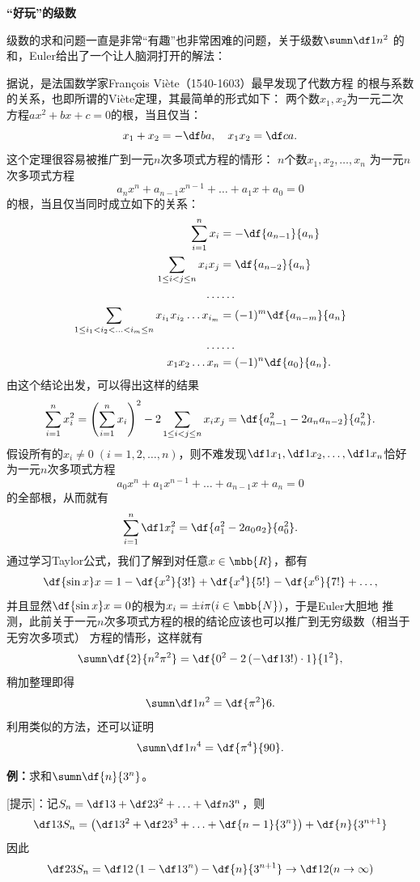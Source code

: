 \begin{shaded}
	{\bf “好玩”的级数}
	
	级数的求和问题一直是非常“有趣”也非常困难的问题，关于级数$\sumn\df1{n^2}$
	的和，Euler给出了一个让人脑洞打开的解法：
	
	据说，是法国数学家François Viète（1540-1603）最早发现了代数方程
	的根与系数的关系，也即所谓的{\kaishu Viète定理}，其最简单的形式如下：
	两个数$x_1,x_2$为一元二次方程$ax^2+bx+c=0$的根，当且仅当：
	$$x_1+x_2=-\df ba,\quad x_1x_2=\df ca.$$
	这个定理很容易被推广到一元$n$次多项式方程的情形：	$n$个数$x_1,x_2,\ldots,x_n$
	为一元$n$次多项式方程
	$$a_nx^n+a_{n-1}x^{n-1}+\ldots+a_1x+a_0=0$$
	的根，当且仅当同时成立如下的关系：
	\begin{align*}
		\sum\limits_{i=1}^nx_i&=-\df{a_{n-1}}{a_n}\\
		\sum\limits_{1\leq i<j\leq n}x_ix_j&=\df{a_{n-2}}{a_n}\\
		\ldots&\ldots\\
		\sum\limits_{1\leq i_1<i_2<\ldots<i_m\leq n}
		x_{i_1}x_{i_2}\ldots x_{i_m}&=(-1)^m\df{a_{n-m}}{a_n}\\
		\ldots&\ldots\\
		x_1x_2\ldots x_n&=(-1)^n\df{a_0}{a_n}.
	\end{align*}
	由这个结论出发，可以得出这样的结果
	$$\sum\limits_{i=1}^nx_i^2=\left(\sum\limits_{i=1}^nx_i\right)^2
	-2\sum\limits_{1\leq i<j\leq n}x_ix_j=\df{a_{n-1}^2-2a_na_{n-2}}{a_n^2}.$$
	假设所有的$x_i\ne0\;(i=1,2,\ldots,n)$，则不难发现$\df1{x_1},\df1{x_2},\ldots,
	\df1{x_n}$恰好为一元$n$次多项式方程
	$$a_0x^n+a_1x^{n-1}+\ldots+a_{n-1}x+a_n=0$$
	的全部根，从而就有
	$$\sum\limits_{i=1}^n\df1{x_i^2}=\df{a_1^2-2a_0a_2}{a_0^2}.$$
	通过学习Taylor公式，我们了解到对任意$x\in\mbb{R}$，都有
	$$\df{\sin x}x=1-\df{x^2}{3!}+\df{x^4}{5!}-\df{x^6}{7!}+\ldots,$$
	并且显然$\df{\sin x}x=0$的根为$x_i=\pm i\pi(i\in\mbb{N})$，于是Euler大胆地
	推测，此前关于一元$n$次多项式方程的根的结论应该也可以推广到无穷级数（相当于无穷次多项式）
	方程的情形，这样就有
	$$\sumn\df{2}{n^2\pi^2}=\df{0^2-2\left(-\df1{3!}\right)\cdot1}{1^2},$$
	稍加整理即得
	$$\sumn\df1{n^2}=\df{\pi^2}6.$$
	利用类似的方法，还可以证明
	$$\sumn\df1{n^4}=\df{\pi^4}{90}.$$
\end{shaded}


{\bf 例：}求和$\sumn\df{n}{3^n}$。

[提示]：记$S_n=\df13+\df2{3^2}+\ldots+\df n{3^n}$，则
$$\df13S_n=\left(\df1{3^2}+\df2{3^3}+\ldots
+\df{n-1}{3^n}\right)+\df{n}{3^{n+1}}$$
因此
$$\df23S_n=\df12\left(1-\df1{3^n}\right)-\df{n}{3^{n+1}}\to\df12
(n\to\infty)$$

